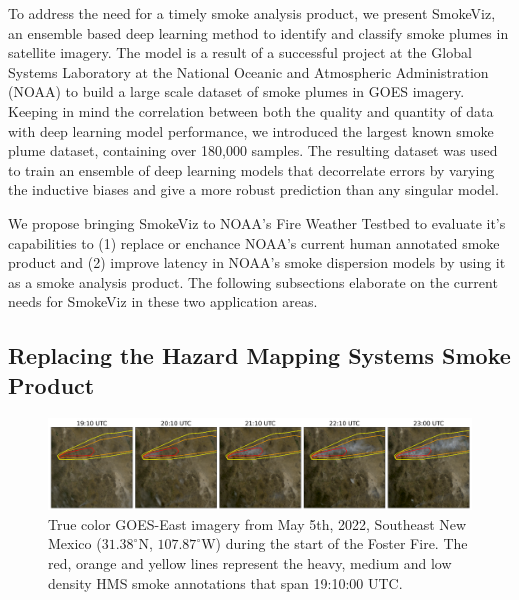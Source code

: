 To address the need for a timely smoke analysis product, we present SmokeViz, an ensemble based deep learning method to identify and classify smoke plumes in satellite imagery. The model is a result of a successful project at the Global Systems Laboratory at the National Oceanic and Atmospheric Administration (NOAA) to build a large scale dataset of smoke plumes in GOES imagery. Keeping in mind the correlation between both the quality and quantity of data with deep learning model performance, we introduced the largest known smoke plume dataset, containing over 180,000 samples. The resulting dataset was used to train an ensemble of deep learning models that decorrelate errors by varying the inductive biases and give a more robust prediction than any singular model. 

We propose bringing SmokeViz to NOAA's Fire Weather Testbed to evaluate it's capabilities to (1) replace or enchance NOAA's current human annotated smoke product and (2) improve latency in NOAA's smoke dispersion models by using it as a smoke analysis product. The following subsections elaborate on the current needs for SmokeViz in these two application areas. 

\subsection{Replacing the Hazard Mapping Systems Smoke Product} 

\begin{figure}
    \centering
    \includegraphics[width=\linewidth]{figures/TIMELAPSE_FINAL2.png}
    \caption{True color GOES-East imagery from May 5th, 2022, Southeast New Mexico (\(31.38^{\circ}\)N, \(107.87^{\circ}\)W) during the start of the Foster Fire. The red, orange and yellow lines represent the heavy, medium and low density HMS smoke annotations that span 19:10:00 UTC.}
    \label{timelapse}
\end{figure}

